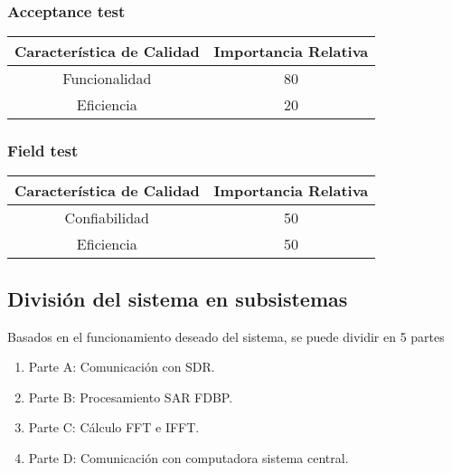 \documentclass[
11pt, %
]{charter}
\begin{document}
\subsubsection{Acceptance test}


\begin{table}[h!]
\begin{center}
\begin{tabular}{| c | c |}
\hline
\rowcolor[HTML]{C0C0C0}
Característica de Calidad	& 	Importancia Relativa  \\ \hline
Funcionalidad          		&   80					  \\ \hline
Eficiencia   				&   20					  \\ \hline
\end{tabular}
\label{tab:System test}
\end{center}
\end{table} 

\newpage

\subsubsection{Field test}

\begin{table}[h!]
\begin{center}
\begin{tabular}{| c | c |}
\hline
\rowcolor[HTML]{C0C0C0}
Característica de Calidad	& 	Importancia Relativa  \\ \hline
Confiabilidad          		&   50					  \\ \hline
Eficiencia   				&   50					  \\ \hline
\end{tabular}
\label{tab:Field test}
\end{center}
\end{table} 

 

\subsection{División del sistema en subsistemas}
Basados en el funcionamiento deseado del sistema, se puede dividir en 5 partes

\begin{enumerate}
\item Parte A: Comunicación con SDR.
\item Parte B: Procesamiento SAR FDBP.
\item Parte C: Cálculo FFT e IFFT.
\item Parte D: Comunicación con computadora sistema central.
\end{enumerate}
\end{document}
